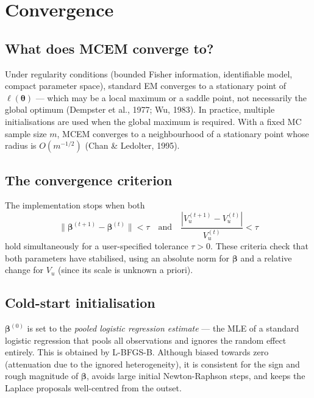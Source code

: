 \documentclass[11pt,a4paper]{article}
\theoremstyle{definition}
\theoremstyle{remark}
\newcommand{\bbeta}{\boldsymbol{\beta}}
\newcommand{\btheta}{\boldsymbol{\theta}}
\begin{document}
\section{Convergence}

\subsection{What does MCEM converge to?}

Under regularity conditions (bounded Fisher information, identifiable model,
compact parameter space), standard EM converges to a stationary point of
$\ell(\btheta)$ — which may be a local maximum or a saddle point, not
necessarily the global optimum (Dempster et al., 1977; Wu, 1983).
In practice, multiple initialisations are used when the global maximum is
required.  With a fixed MC sample size $m$, MCEM converges to a
neighbourhood of a stationary point whose radius is $O(m^{-1/2})$
(Chan \& Ledolter, 1995).

\subsection{The convergence criterion}

The implementation stops when both
\[
  \|\bbeta^{(t+1)} - \bbeta^{(t)}\| < \tau
  \quad\text{and}\quad
  \frac{|V_u^{(t+1)} - V_u^{(t)}|}{V_u^{(t)}} < \tau
\]
hold simultaneously for a user-specified tolerance $\tau > 0$.
These criteria check that both parameters have stabilised, using an absolute
norm for $\bbeta$ and a relative change for $V_u$ (since its scale is unknown a priori).

\subsection{Cold-start initialisation}

$\bbeta^{(0)}$ is set to the \emph{pooled logistic regression estimate} —
the MLE of a standard logistic regression that pools all observations and
ignores the random effect entirely.  This is obtained by L-BFGS-B.
Although biased towards zero (attenuation due to the ignored heterogeneity),
it is consistent for the sign and rough magnitude of $\bbeta$, avoids large
initial Newton-Raphson steps, and keeps the Laplace proposals well-centred
from the outset.

\end{document}
